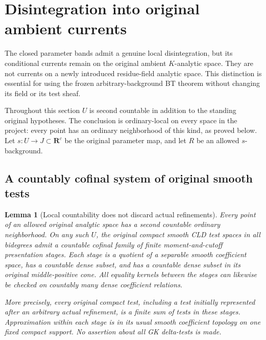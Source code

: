 \documentclass[11pt,a4paper]{article}
\numberwithin{equation}{section}
\newtheorem{lemma}[theorem]{Lemma}
\theoremstyle{definition}
\theoremstyle{remark}
\begin{document}


\section{Disintegration into original ambient currents}
\label{sec:r12-original-current-disintegration}

The closed parameter bands admit a genuine local disintegration,
but its conditional currents remain on the original ambient
$K$-analytic space. They are not currents on a newly introduced
residue-field analytic space. This distinction is essential for
using the frozen arbitrary-background BT theorem without changing
its field or its test sheaf.

Throughout this section $U$ is second countable in addition to the
standing original hypotheses. The conclusion is ordinary-local on
every space in the project: every point has an ordinary neighborhood
of this kind, as proved below. Let $s:U\to J\subset\mathbf R^c$ be
the original parameter map, and let $R$ be an allowed $s$-background.

\subsection{A countably cofinal system of original smooth tests}

\begin{lemma}[Local countability does not discard actual refinements]
\label{lem:r12-countably-cofinal-original-tests}
Every point of an allowed original analytic space has a second
countable ordinary neighborhood. On any such $U$, the original
compact smooth CLD test spaces in all bidegrees admit a countable
cofinal family of finite moment-and-cutoff presentation stages.
Each stage is a quotient of a separable smooth coefficient space,
has a countable dense subset, and has a countable dense subset in
its original middle-positive cone. All equality kernels between
the stages can likewise be checked on countably many dense
coefficient relations.

More precisely, every original compact test, including a test
initially represented after an arbitrary actual refinement, is a
finite sum of tests in these stages. Approximation within each
stage is in its usual smooth coefficient topology on one fixed
compact support. No assertion about all GK delta-tests is made.
\end{lemma}
\end{document}
